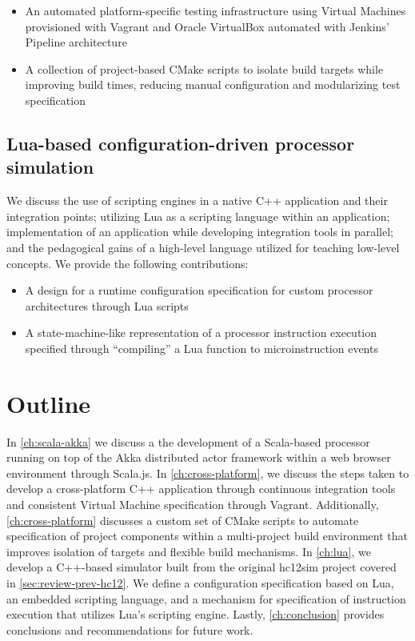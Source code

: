 \begin{itemize}
    \item An automated platform-specific testing infrastructure using Virtual Machines provisioned with Vagrant and Oracle VirtualBox automated with Jenkins' Pipeline architecture
    \item A collection of project-based CMake scripts to isolate build targets while improving build times, reducing manual configuration and modularizing test specification
\end{itemize}

\subsection{Lua-based configuration-driven processor simulation}

We discuss the use of scripting engines in a native C++ application and their integration points; utilizing Lua as a scripting language within an application; implementation of an application while developing integration tools in parallel; and the pedagogical gains of a high-level language utilized for teaching low-level concepts. We provide the following contributions:

\begin{itemize}
    \item A design for a runtime configuration specification for custom processor architectures through Lua scripts
    \item A state-machine-like representation of a processor instruction execution specified through ``compiling'' a Lua function to microinstruction events
\end{itemize}

\section{Outline} 


In \cref{ch:scala-akka} we discuss a the development of a Scala-based processor running on top of the Akka distributed actor framework within a web browser environment through Scala.js. In \cref{ch:cross-platform}, we discuss the steps taken to develop a cross-platform C++ application through continuous integration tools and consistent Virtual Machine specification through Vagrant. Additionally, \cref{ch:cross-platform} discusses a custom set of CMake scripts to automate specification of project components within a multi-project build environment that improves isolation of targets  and flexible build mechanisms. In \cref{ch:lua}, we develop a C++-based simulator built from the original hc12sim project covered in \cref{sec:review-prev-hc12}. We define a configuration specification based on Lua, an embedded scripting language, and a mechanism for specification of instruction execution that utilizes Lua's scripting engine. Lastly, \cref{ch:conclusion} provides conclusions and recommendations for future work. 
